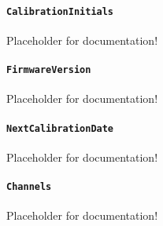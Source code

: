 \paragraph{\texttt{CalibrationInitials}}\mbox{}
\newline\tab Placeholder for documentation!

\paragraph{\texttt{FirmwareVersion}}\mbox{}
\newline\tab Placeholder for documentation!

\paragraph{\texttt{NextCalibrationDate}}\mbox{}
\newline\tab Placeholder for documentation!

\paragraph{\texttt{Channels}}\mbox{}
\newline\tab Placeholder for documentation!
\FloatBarrier
